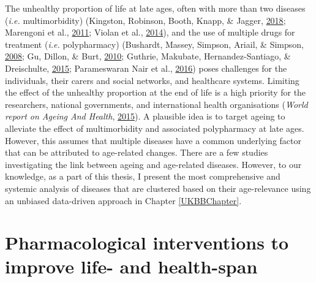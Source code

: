 \documentclass[12pt,twoside]{unicam}
\begin{document}
The unhealthy proportion of life at late ages, often with more than two diseases (\emph{i.e.} multimorbidity) (Kingston, Robinson, Booth, Knapp, \& Jagger, \protect\hyperlink{ref-Kingston2018}{2018}; Marengoni et al., \protect\hyperlink{ref-Marengoni2011}{2011}; Violan et al., \protect\hyperlink{ref-Violan2014}{2014}), and the use of multiple drugs for treatment (\emph{i.e.} polypharmacy) (Bushardt, Massey, Simpson, Ariail, \& Simpson, \protect\hyperlink{ref-Bushardt2008}{2008}; Gu, Dillon, \& Burt, \protect\hyperlink{ref-Gu2010}{2010}; Guthrie, Makubate, Hernandez-Santiago, \& Dreischulte, \protect\hyperlink{ref-Guthrie2015}{2015}; Parameswaran Nair et al., \protect\hyperlink{ref-ParameswaranNair2016}{2016}) poses challenges for the individuals, their carers and social networks, and healthcare systems. Limiting the effect of the unhealthy proportion at the end of life is a high priority for the researchers, national governments, and international health organisations (\emph{World report on Ageing And Health}, \protect\hyperlink{ref-WHO2015}{2015}). A plausible idea is to target ageing to alleviate the effect of multimorbidity and associated polypharmacy at late ages. However, this assumes that multiple diseases have a common underlying factor that can be attributed to age-related changes. There are a few studies investigating the link between ageing and age-related diseases. However, to our knowledge, as a part of this thesis, I present the most comprehensive and systemic analysis of diseases that are clustered based on their age-relevance using an unbiased data-driven approach in Chapter \ref{UKBBChapter}.

\hypertarget{introInterventions}{%
\section{Pharmacological interventions to improve life- and health-span}\label{introInterventions}}
\end{document}
